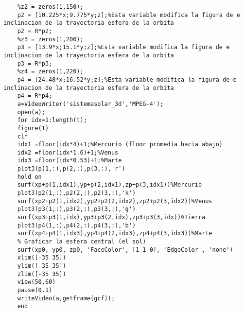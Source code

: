 \documentclass[12pt]{article}
\begin{document}
\begin{lstlisting}
	%z2 = zeros(1,150);
	p2 = [10.225*x;9.775*y;z];%Esta variable modifica la figura de e inclinacion de la trayectoria esfera de la orbita
	p2 = R*p2;
	%z3 = zeros(1,200);
	p3 = [13.9*x;15.1*y;z];%Esta variable modifica la figura de e inclinacion de la trayectoria esfera de la orbita
	p3 = R*p3;
	%z4 = zeros(1,220);
	p4 = [24.48*x;16.52*y;z];%Esta variable modifica la figura de e inclinacion de la trayectoria esfera de la orbita
	p4 = R*p4;
	a=VideoWriter('sistemasolar_3d','MPEG-4');
	open(a);
	for idx=1:length(t);
	figure(1)
	clf
	idx1 =floor(idx*4)+1;%Mercurio (floor promedia hacia abajo)
	idx2 =floor(idx*1.6)+1;%Venus
	idx3 =floor(idx*0.53)+1;%Marte
	plot3(p(1,:),p(2,:),p(3,:),'r')
	hold on
	surf(xp+p(1,idx1),yp+p(2,idx1),zp+p(3,idx1))%Mercurio
	plot3(p2(1,:),p2(2,:),p2(3,:),'k')
	surf(xp2+p2(1,idx2),yp2+p2(2,idx2),zp2+p2(3,idx2))%Venus
	plot3(p3(1,:),p3(2,:),p3(3,:),'g')
	surf(xp3+p3(1,idx),yp3+p3(2,idx),zp3+p3(3,idx))%Tierra
	plot3(p4(1,:),p4(2,:),p4(3,:),'b')
	surf(xp4+p4(1,idx3),yp4+p4(2,idx3),zp4+p4(3,idx3))%Marte
	% Graficar la esfera central (el sol)
	surf(xp0, yp0, zp0, 'FaceColor', [1 1 0], 'EdgeColor', 'none')
	xlim([-35 35])
	ylim([-35 35])
	zlim([-35 35])
	view(50,60)
	pause(0.1)
	writeVideo(a,getframe(gcf));
	end
	
	\end{lstlisting}
	
\end{document}
